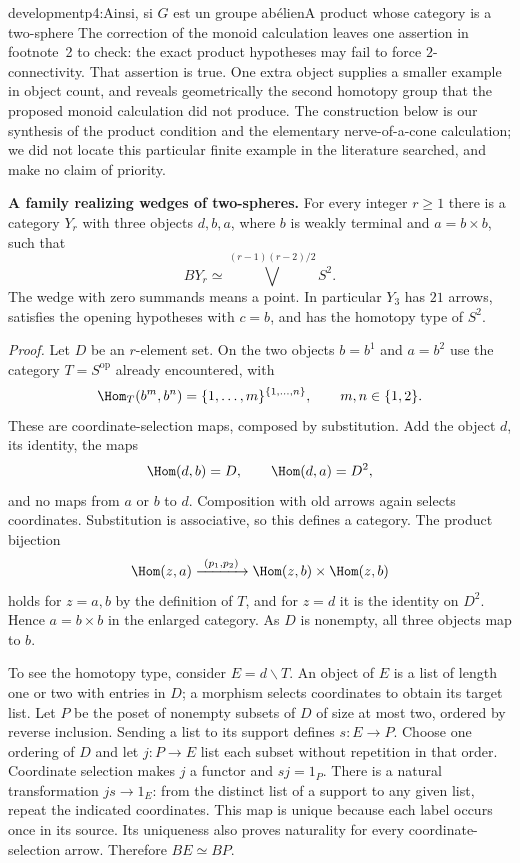 \begin{dcomment}{development}{p4:Ainsi, si $G$ est un groupe abélien}{A product whose category is a two-sphere}
The correction of the monoid calculation leaves one assertion in footnote~2 to check: the exact product hypotheses may fail to force $2$-connectivity. That assertion is true. One extra object supplies a smaller example in object count, and reveals geometrically the second homotopy group that the proposed monoid calculation did not produce. The construction below is our synthesis of the product condition and the elementary nerve-of-a-cone calculation; we did not locate this particular finite example in the literature searched, and make no claim of priority.

\textbf{A family realizing wedges of two-spheres.}\ours
For every integer $r\ge1$ there is a category $Y_r$ with three objects $d,b,a$, where $b$ is weakly terminal and $a=b\times b$, such that
\[
 BY_r\simeq\bigvee^{(r-1)(r-2)/2}S^2.
\]
The wedge with zero summands means a point. In particular $Y_3$ has $21$ arrows, satisfies the opening hypotheses with $c=b$, and has the homotopy type of $S^2$.

\emph{Proof.} Let $D$ be an $r$-element set. On the two objects $b=b^1$ and $a=b^2$ use the category $T=S^{\mathrm{op}}$ already encountered, with
\[
 \Hom_T(b^m,b^n)=\{1,\ldots,m\}^{\{1,\ldots,n\}},
 \qquad m,n\in\{1,2\}.
\]
These are coordinate-selection maps, composed by substitution. Add the object $d$, its identity, the maps
\[
 \Hom(d,b)=D,\qquad \Hom(d,a)=D^2,
\]
and no maps from $a$ or $b$ to $d$. Composition with old arrows again selects coordinates. Substitution is associative, so this defines a category. The product bijection
\[
 \Hom(z,a)\xrightarrow{\ (p_1,p_2)\ }
 \Hom(z,b)\times\Hom(z,b)
\]
holds for $z=a,b$ by the definition of $T$, and for $z=d$ it is the identity on $D^2$. Hence $a=b\times b$ in the enlarged category. As $D$ is nonempty, all three objects map to $b$.

To see the homotopy type, consider $E=d\backslash T$. An object of $E$ is a list of length one or two with entries in $D$; a morphism selects coordinates to obtain its target list. Let $P$ be the poset of nonempty subsets of $D$ of size at most two, ordered by reverse inclusion. Sending a list to its support defines $s:E\to P$. Choose one ordering of $D$ and let $j:P\to E$ list each subset without repetition in that order. Coordinate selection makes $j$ a functor and $sj=1_P$. There is a natural transformation $js\to1_E$: from the distinct list of a support to any given list, repeat the indicated coordinates. This map is unique because each label occurs once in its source. Its uniqueness also proves naturality for every coordinate-selection arrow. Therefore $BE\simeq BP$.


\end{dcomment}
